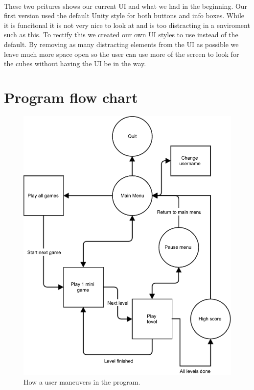 \paragraph{}
These two pcitures shows our current UI and what we had in the beginning.
Our first version used the default Unity style for both buttons and info boxes.
While it is funcitonal it is not very nice to look at and is too distracting in a enviroment such as this.
To rectify this we created our own UI styles to use instead of the default.
By removing as many distracting elements from the UI as possible we leave much more space open so the user can use more of the
screen to look for the cubes without having the UI be in the way.



\newpage
\section{Program flow chart}

\begin{figure}[ht]
	\capstart
	\includegraphics[width=\textwidth]{images/user_flow_chart}
	\caption[Program flow chart]{How a user maneuvers in the program.}
	\label{fig:program_flow_chart}
\end{figure}

